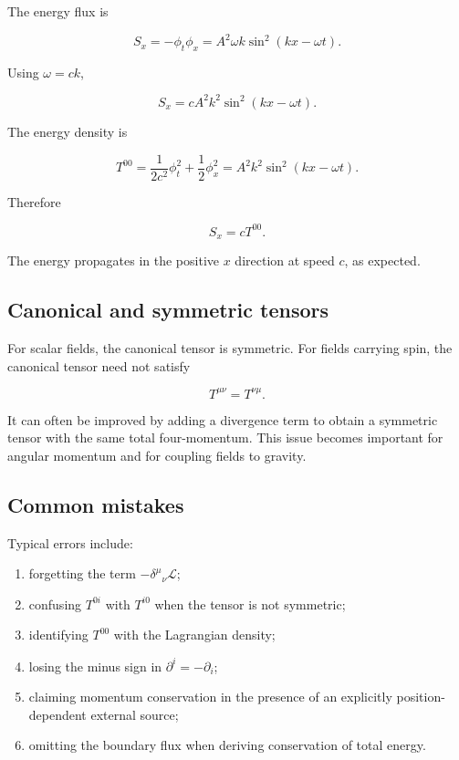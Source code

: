 The energy flux is

\[
S_x
=
-\phi_t\phi_x
=
A^{2}\omega k
\sin^{2}(kx-\omega t).
\]

Using \(\omega=ck\),

\[
S_x
=
cA^{2}k^{2}
\sin^{2}(kx-\omega t).
\]

The energy density is

\[
T^{00}
=
\frac{1}{2c^{2}}\phi_t^{2}
+
\frac{1}{2}\phi_x^{2}
=
A^{2}k^{2}
\sin^{2}(kx-\omega t).
\]

Therefore

\[
\boxed{
S_x=cT^{00}
}.
\]

The energy propagates in the positive \(x\) direction at speed \(c\), as expected.

\subsection{Canonical and symmetric tensors}

For scalar fields, the canonical tensor is symmetric. For fields carrying spin, the canonical tensor need not satisfy

\[
T^{\mu\nu}=T^{\nu\mu}.
\]

It can often be improved by adding a divergence term to obtain a symmetric tensor with the same total four-momentum. This issue becomes important for angular momentum and for coupling fields to gravity.

\subsection{Common mistakes}

Typical errors include:

\begin{enumerate}
    \item forgetting the term \(-\delta^{\mu}{}_{\nu}\mathcal{L}\);
    \item confusing \(T^{0i}\) with \(T^{i0}\) when the tensor is not symmetric;
    \item identifying \(T^{00}\) with the Lagrangian density;
    \item losing the minus sign in \(\partial^{i}=-\partial_i\);
    \item claiming momentum conservation in the presence of an explicitly position-dependent external source;
    \item omitting the boundary flux when deriving conservation of total energy.
\end{enumerate}


